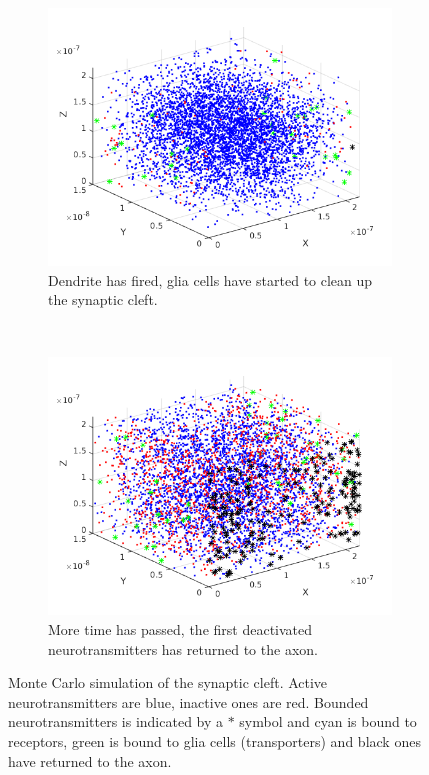 \begin{figure}[ht]
\begin{subfigure}[b]{0.45 \textwidth}
                \includegraphics[width=\textwidth]{sim03}
                \caption{Dendrite has fired, glia cells have started to clean up the synaptic cleft.}
        \end{subfigure}
        ~
        \begin{subfigure}[b]{0.45 \textwidth}
                \includegraphics[width=\textwidth]{sim04}
                \caption{More time has passed, the first deactivated neurotransmitters has returned to the axon.}
        \end{subfigure}
        \caption{Monte Carlo simulation of the synaptic cleft. Active neurotransmitters are blue, inactive ones are red. Bounded neurotransmitters is indicated by a $*$ symbol and cyan is bound to receptors, green is bound to glia cells (transporters) and black ones have returned to the axon.}
        \label{fig:3dsim}
\end{figure}



